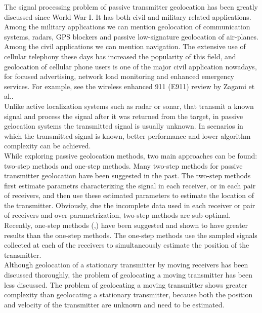 \documentclass[10pt,a4paper]{report}
\begin{document}
The signal processing problem of passive transmitter geolocation has been greatly discussed since World War I. It has both civil and military related applications. Among the military applications we can mention geolocation of communication systems, radars, GPS blockers and passive low-signature geolocation of air-planes. Among the civil applications we can mention navigation. The extensive use of cellular telephony these days has increased the popularity of this field, and geolocation of cellular phone users is one of the major civil application nowadays, for focused advertising, network load monitoring and enhanced emergency services. For example, see the wireless enhanced 911 (E911) review by Zagami et al.\cite{zagami}.\\

Unlike active localization systems such as radar or sonar, that transmit a known signal and process the signal after it was returned from the target, in passive gelocation systems the transmitted signal is usually unknown. In scenarios in which the transmitted signal is known, better performance and lower algorithm complexity can be achieved.\\

While exploring passive geolocation methods, two main approaches can be found: two-step methods and one-step methods. Many two-step methods for passive transmitter geolocation have been suggested in the past. The two-step methods first estimate parametrs characterizing the signal in each receiver, or in each pair of receivers, and then use these estimated parameters to estimate the location of the transmitter. Obviously, due the incomplete data used in each receiver or pair of receivers and over-parametrization, two-step methods are sub-optimal. Recently, one-step methods (\cite{dpd},\cite{dpd_nb}) have been suggested and shown to have greater results than the one-step methods. The one-step methods use the sampled signals collected at each of the receivers to simultaneously estimate the position of the transmitter.\\

Although geolocation of a stationary transmitter by moving receivers has been discussed thoroughly, the problem of geolocating a moving transmitter has been less discussed. The problem of geolocating a moving transmitter shows greater complexity than geolocating a stationary transmitter, because both the position and velocity of the transmitter are unknown and need to be estimated.\\
\end{document}

